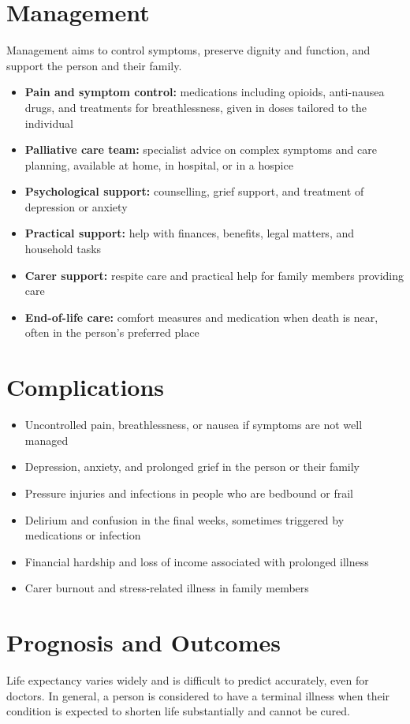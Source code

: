 \section*{Management}
Management aims to control symptoms, preserve dignity and function, and support the person and their family.

\begin{itemize}
    \item \textbf{Pain and symptom control:} medications including opioids, anti-nausea drugs, and treatments for breathlessness, given in doses tailored to the individual
    \item \textbf{Palliative care team:} specialist advice on complex symptoms and care planning, available at home, in hospital, or in a hospice
    \item \textbf{Psychological support:} counselling, grief support, and treatment of depression or anxiety
    \item \textbf{Practical support:} help with finances, benefits, legal matters, and household tasks
    \item \textbf{Carer support:} respite care and practical help for family members providing care
    \item \textbf{End-of-life care:} comfort measures and medication when death is near, often in the person's preferred place
\end{itemize}

\section*{Complications}
\begin{itemize}
    \item Uncontrolled pain, breathlessness, or nausea if symptoms are not well managed
    \item Depression, anxiety, and prolonged grief in the person or their family
    \item Pressure injuries and infections in people who are bedbound or frail
    \item Delirium and confusion in the final weeks, sometimes triggered by medications or infection
    \item Financial hardship and loss of income associated with prolonged illness
    \item Carer burnout and stress-related illness in family members
\end{itemize}

\section*{Prognosis and Outcomes}
Life expectancy varies widely and is difficult to predict accurately, even for doctors. In general, a person is considered to have a terminal illness when their condition is expected to shorten life substantially and cannot be cured.


